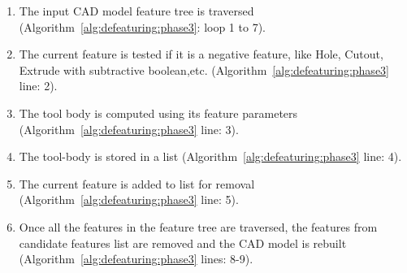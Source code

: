 \bigskip


\begin{enumerate}
[noitemsep,topsep=2pt,parsep=2pt,partopsep=2pt]
\item The input CAD model feature tree is traversed (Algorithm~\ref{alg:defeaturing:phase3}: loop 1 to 7). 
\item  The current feature is tested if it is a negative feature, like Hole, Cutout, Extrude with subtractive boolean,etc. (Algorithm~\ref{alg:defeaturing:phase3} line: 2). 
\item The tool body is computed using its feature parameters (Algorithm~\ref{alg:defeaturing:phase3} line: 3). 
\item The tool-body is stored in a list (Algorithm~\ref{alg:defeaturing:phase3} line: 4). 
\item The current feature is added to list for removal (Algorithm~\ref{alg:defeaturing:phase3} line: 5). 
\item Once all the features in the feature tree are traversed, the features from candidate features list are removed and the CAD model is rebuilt (Algorithm~\ref{alg:defeaturing:phase3} lines: 8-9).
\end{enumerate}







	


